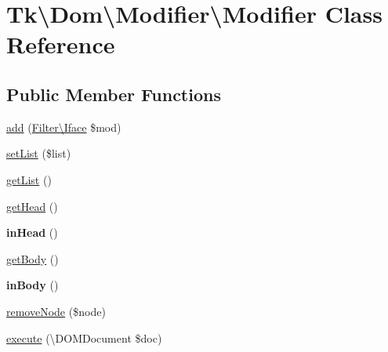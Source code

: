 \hypertarget{classTk_1_1Dom_1_1Modifier_1_1Modifier}{\section{Tk\textbackslash{}Dom\textbackslash{}Modifier\textbackslash{}Modifier Class Reference}
\label{classTk_1_1Dom_1_1Modifier_1_1Modifier}
}
\subsection*{Public Member Functions}
\begin{DoxyCompactItemize}
\item 
\hyperlink{classTk_1_1Dom_1_1Modifier_1_1Modifier_a0998e8fd8ab8d99833f17515bf131d4f}{add} (\hyperlink{classTk_1_1Dom_1_1Modifier_1_1Filter_1_1Iface}{Filter\textbackslash{}\+Iface} \$mod)
\item 
\hyperlink{classTk_1_1Dom_1_1Modifier_1_1Modifier_aad296dfb2a5d54e1825e6b0e2afcc17f}{set\+List} (\$list)
\item 
\hyperlink{classTk_1_1Dom_1_1Modifier_1_1Modifier_ab06de99499044ad72d65b912b7a32e66}{get\+List} ()
\item 
\hyperlink{classTk_1_1Dom_1_1Modifier_1_1Modifier_a1d3702989373eb59e48d8b256175610b}{get\+Head} ()
\item 
\hypertarget{classTk_1_1Dom_1_1Modifier_1_1Modifier_aad54df6202c1117d3d6390a24892129f}{{\bfseries in\+Head} ()}\label{classTk_1_1Dom_1_1Modifier_1_1Modifier_aad54df6202c1117d3d6390a24892129f}

\item 
\hyperlink{classTk_1_1Dom_1_1Modifier_1_1Modifier_a7b95046ea3a79d6c39626d490170dd3a}{get\+Body} ()
\item 
\hypertarget{classTk_1_1Dom_1_1Modifier_1_1Modifier_a8fdd15c4f8d3064f22dea2392f6bac8e}{{\bfseries in\+Body} ()}\label{classTk_1_1Dom_1_1Modifier_1_1Modifier_a8fdd15c4f8d3064f22dea2392f6bac8e}

\item 
\hyperlink{classTk_1_1Dom_1_1Modifier_1_1Modifier_a9d4fd2c161dd0f0a9caa440fa0eaacfe}{remove\+Node} (\$node)
\item 
\hyperlink{classTk_1_1Dom_1_1Modifier_1_1Modifier_a39f9cf503366be8dfde20712ca09f158}{execute} (\textbackslash{}D\+O\+M\+Document \$doc)
\end{DoxyCompactItemize}
